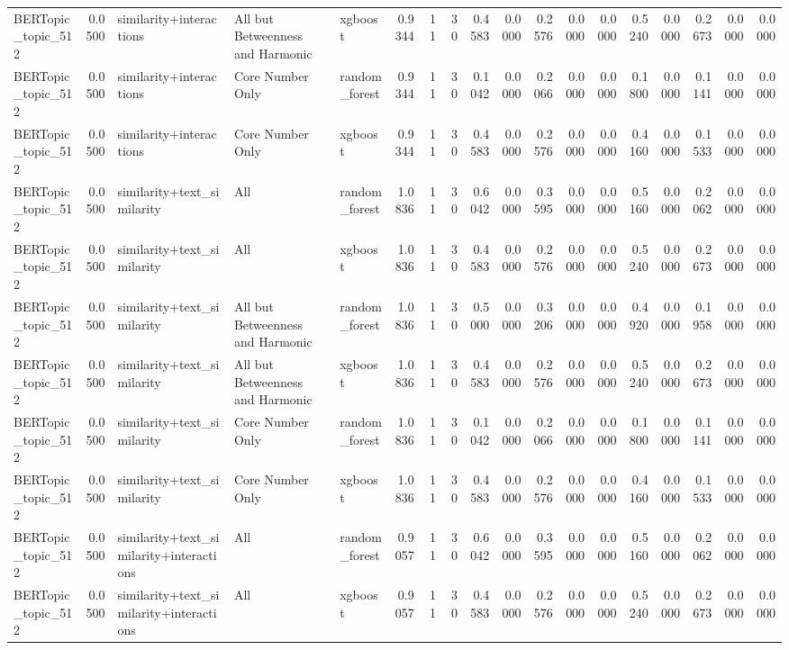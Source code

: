 \begin{tabular}{lrlllrrrrrrrrrrrrr}
BERTopic_topic_512 & 0.0500 & similarity+interactions & All but Betweenness and Harmonic & xgboost & 0.9344 & 11 & 30 & 0.4583 & 0.0000 & 0.2576 & 0.0000 & 0.0000 & 0.5240 & 0.0000 & 0.2673 & 0.0000 & 0.0000 \\
BERTopic_topic_512 & 0.0500 & similarity+interactions & Core Number Only & random_forest & 0.9344 & 11 & 30 & 0.1042 & 0.0000 & 0.2066 & 0.0000 & 0.0000 & 0.1800 & 0.0000 & 0.1141 & 0.0000 & 0.0000 \\
BERTopic_topic_512 & 0.0500 & similarity+interactions & Core Number Only & xgboost & 0.9344 & 11 & 30 & 0.4583 & 0.0000 & 0.2576 & 0.0000 & 0.0000 & 0.4160 & 0.0000 & 0.1533 & 0.0000 & 0.0000 \\
BERTopic_topic_512 & 0.0500 & similarity+text_similarity & All & random_forest & 1.0836 & 11 & 30 & 0.6042 & 0.0000 & 0.3595 & 0.0000 & 0.0000 & 0.5160 & 0.0000 & 0.2062 & 0.0000 & 0.0000 \\
BERTopic_topic_512 & 0.0500 & similarity+text_similarity & All & xgboost & 1.0836 & 11 & 30 & 0.4583 & 0.0000 & 0.2576 & 0.0000 & 0.0000 & 0.5240 & 0.0000 & 0.2673 & 0.0000 & 0.0000 \\
BERTopic_topic_512 & 0.0500 & similarity+text_similarity & All but Betweenness and Harmonic & random_forest & 1.0836 & 11 & 30 & 0.5000 & 0.0000 & 0.3206 & 0.0000 & 0.0000 & 0.4920 & 0.0000 & 0.1958 & 0.0000 & 0.0000 \\
BERTopic_topic_512 & 0.0500 & similarity+text_similarity & All but Betweenness and Harmonic & xgboost & 1.0836 & 11 & 30 & 0.4583 & 0.0000 & 0.2576 & 0.0000 & 0.0000 & 0.5240 & 0.0000 & 0.2673 & 0.0000 & 0.0000 \\
BERTopic_topic_512 & 0.0500 & similarity+text_similarity & Core Number Only & random_forest & 1.0836 & 11 & 30 & 0.1042 & 0.0000 & 0.2066 & 0.0000 & 0.0000 & 0.1800 & 0.0000 & 0.1141 & 0.0000 & 0.0000 \\
BERTopic_topic_512 & 0.0500 & similarity+text_similarity & Core Number Only & xgboost & 1.0836 & 11 & 30 & 0.4583 & 0.0000 & 0.2576 & 0.0000 & 0.0000 & 0.4160 & 0.0000 & 0.1533 & 0.0000 & 0.0000 \\
BERTopic_topic_512 & 0.0500 & similarity+text_similarity+interactions & All & random_forest & 0.9057 & 11 & 30 & 0.6042 & 0.0000 & 0.3595 & 0.0000 & 0.0000 & 0.5160 & 0.0000 & 0.2062 & 0.0000 & 0.0000 \\
BERTopic_topic_512 & 0.0500 & similarity+text_similarity+interactions & All & xgboost & 0.9057 & 11 & 30 & 0.4583 & 0.0000 & 0.2576 & 0.0000 & 0.0000 & 0.5240 & 0.0000 & 0.2673 & 0.0000 & 0.0000 \\

\end{tabular}
